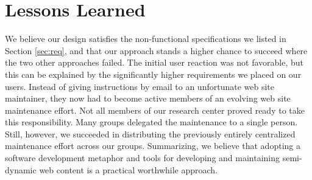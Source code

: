 \documentclass[10pt]{article}
\begin{document}
\section{Lessons Learned}
\label{sec:concl}
We believe our design satisfies the non-functional specifications
we listed in Section \ref{sec:req},
and that our approach stands a higher chance to succeed where the
two other approaches failed.
The initial user reaction was not favorable, but this can
be explained by the significantly higher requirements we
placed on our users.
Instead of giving instructions by email to an unfortunate
web site maintainer, they now had to become active members
of an evolving web site maintenance effort.
Not all members of our research center proved ready to take
this responsibility.
Many groups delegated the maintenance to a single person.
Still, however, we succeeded in distributing the previously
entirely centralized maintenance effort across our groups.
Summarizing, we believe that adopting a software development
metaphor and tools for developing and maintaining semi-dynamic
web content is a practical worthwhile approach.



\end{document}
